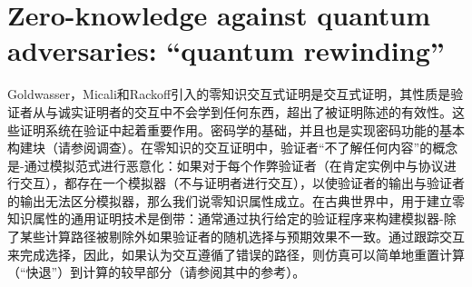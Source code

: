 \section{Zero-knowledge against quantum adversaries: “quantum rewinding”}
Goldwasser，Micali和Rackoff引入的零知识交互式证明是交互式证明，其性质是验证者从与诚实证明者的交互中不会学到任何东西，超出了被证明陈述的有效性。这些证明系统在验证中起着重要作用。密码学的基础，并且也是实现密码功能的基本构建块（请参阅\cite{Goldreich1991}调查）。在零知识的交互证明中，验证者“不了解任何内容”的概念是-通过模拟范式进行恶意化：如果对于每个作弊验证者（在肯定实例中与协议进行交互），都存在一个模拟器（不与证明者进行交互），以使验证者的输出与验证者的输出无法区分模拟器，那么我们说零知识属性成立。在古典世界中，用于建立零知识属性的通用证明技术是倒带：通常通过执行给定的验证程序来构建模拟器-除了某些计算路径被剔除外如果验证者的随机选择与预期效果不一致。通过跟踪交互来完成选择，因此，如果认为交互遵循了错误的路径，则仿真可以简单地重置计算（“快退”）到计算的较早部分（请参阅\cite{Goldreich1991}其中的参考）。

